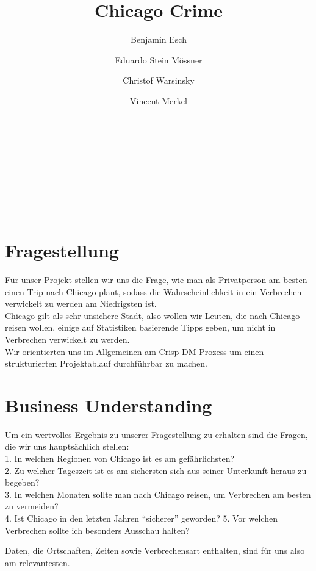 \documentclass[10pt]{article}
\title{Chicago Crime}
\begin{document}
    \maketitle

    \Large{
    {\centering
    \author[1]{Benjamin Esch}\\
    \author[2]{ Eduardo Stein Mössner}\\
    \author[3]{Christof Warsinsky}\\
    \author[4]{Vincent Merkel}\\
    }
    \newpage
    \tableofcontents
    \newpage
    }

    
    \section{Fragestellung}\label{fragestellung}

    Für unser Projekt stellen wir uns die Frage, wie man als Privatperson am
besten einen Trip nach Chicago plant, sodass die Wahrscheinlichkeit in
ein Verbrechen verwickelt zu werden am Niedrigsten ist.\\
Chicago gilt als sehr unsichere Stadt, also wollen wir Leuten, die nach
Chicago reisen wollen, einige auf Statistiken basierende Tipps geben, um
nicht in Verbrechen verwickelt zu werden.\\
Wir orientierten uns im Allgemeinen am Crisp-DM Prozess um einen
strukturierten Projektablauf durchführbar zu machen.

    \section{Business Understanding}\label{business-understanding}

    Um ein wertvolles Ergebnis zu unserer Fragestellung zu erhalten sind die
Fragen, die wir uns hauptsächlich stellen:\\
1. In welchen Regionen von Chicago ist es am gefährlichsten?\\
2. Zu welcher Tageszeit ist es am sichersten sich aus seiner Unterkunft
heraus zu begeben?\\
3. In welchen Monaten sollte man nach Chicago reisen, um Verbrechen am
besten zu vermeiden?\\
4. Ist Chicago in den letzten Jahren ``sicherer'' geworden? 5. Vor
welchen Verbrechen sollte ich besonders Ausschau halten?

Daten, die Ortschaften, Zeiten sowie Verbrechensart enthalten, sind für
uns also am relevantesten.
\end{document}
